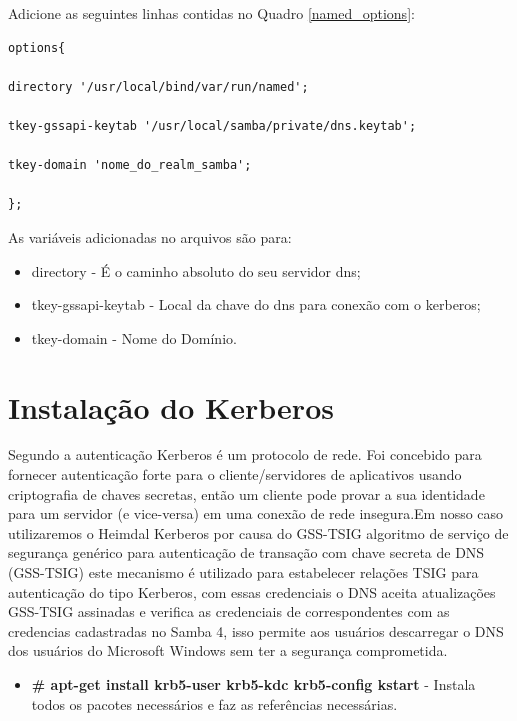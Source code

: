 Adicione as seguintes linhas contidas no Quadro \ref{named_options}:\\

\begin{lstlisting}[caption=Arquivo named.options,label={named_options}]
options{ 
	
directory '/usr/local/bind/var/run/named'; 

tkey-gssapi-keytab '/usr/local/samba/private/dns.keytab'; 

tkey-domain 'nome_do_realm_samba';
	
};
\end{lstlisting}

As variáveis adicionadas no arquivos são para:

\begin{itemize}
	\item{directory} -  É o caminho absoluto do seu servidor dns;
	\item{tkey-gssapi-keytab} - Local da chave do dns para conexão com o kerberos;
	\item{tkey-domain} - Nome do Domínio.
\end{itemize}

\section{Instalação do Kerberos}

Segundo  a autenticação Kerberos é um protocolo de rede. Foi concebido para fornecer autenticação forte para o cliente/servidores de aplicativos usando criptografia de chaves secretas, então um cliente pode provar a sua identidade para um servidor (e vice-versa) em uma conexão de rede insegura.Em nosso caso utilizaremos o Heimdal Kerberos por causa do GSS-TSIG algoritmo de serviço de segurança genérico para autenticação de transação com chave secreta de DNS (GSS-TSIG) este mecanismo é utilizado para estabelecer relações TSIG para autenticação do tipo Kerberos, com essas credenciais o DNS aceita atualizações GSS-TSIG assinadas e verifica as credenciais de correspondentes com as credencias cadastradas no Samba 4, isso permite aos usuários descarregar o DNS dos usuários do Microsoft Windows sem ter a segurança comprometida.

\begin{itemize}
	\item \textbf{\# apt-get install krb5-user krb5-kdc krb5-config kstart} - Instala todos os pacotes necessários e faz as referências necessárias.
\end{itemize}

